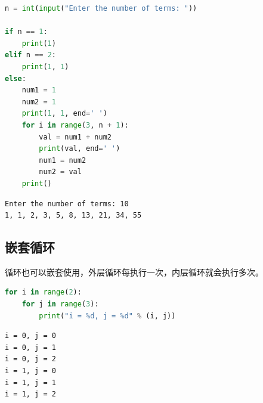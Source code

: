 \begin{lstlisting}[language=Python]
n = int(input("Enter the number of terms: "))

if n == 1:
	print(1)
elif n == 2:
	print(1, 1)
else:
	num1 = 1
	num2 = 1
	print(1, 1, end=' ')
	for i in range(3, n + 1):
		val = num1 + num2
		print(val, end=' ')
		num1 = num2
		num2 = val
	print()
\end{lstlisting}

\begin{tcolorbox}
	\begin{verbatim}
Enter the number of terms: 10
1, 1, 2, 3, 5, 8, 13, 21, 34, 55
\end{verbatim}
\end{tcolorbox}

\vspace{0.5cm}

\subsection{嵌套循环}

循环也可以嵌套使用，外层循环每执行一次，内层循环就会执行多次。

\vspace{-0.5cm}

\begin{lstlisting}[language=Python]
for i in range(2):
	for j in range(3):
		print("i = %d, j = %d" % (i, j))
\end{lstlisting}

\begin{tcolorbox}
	\begin{verbatim}
i = 0, j = 0
i = 0, j = 1
i = 0, j = 2
i = 1, j = 0
i = 1, j = 1
i = 1, j = 2
\end{verbatim}
\end{tcolorbox}

\vspace{0.5cm}

\\


